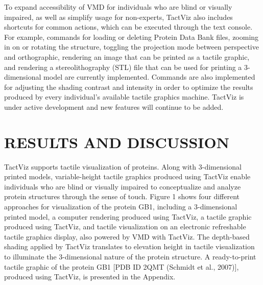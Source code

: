 \documentclass[11.5pt]{sig-alternate} %
\begin{document}
\begin{large}
To expand accessibility of VMD for individuals who are blind or visually impaired, as well as simplify usage for non-experts, TactViz also includes shortcuts for common actions, which can be executed through the text console. For example, commands for loading or deleting Protein Data Bank files, zooming in on or rotating the structure, toggling the projection mode between perspective and orthographic, rendering an image that can be printed as a tactile graphic, and rendering a stereolithography (STL) file that can be used for printing a 3-dimensional model are currently implemented. Commands are also implemented for adjusting the shading contrast and intensity in order to optimize the results produced by every individual’s available tactile graphics machine. TactViz is under active development and new features will continue to be added.

\section*{RESULTS AND DISCUSSION}

TactViz supports tactile visualization of proteins. Along with 3-dimensional printed models, variable-height tactile graphics produced using TactViz enable individuals who are blind or visually impaired to conceptualize and analyze protein structures through the sense of touch. Figure 1 shows four different approaches for visualization of the protein GB1, including a 3-dimensional printed model, a computer rendering produced using TactViz, a tactile graphic produced using TactViz, and tactile visualization on an electronic refreshable tactile graphics display, also powered by VMD with TactViz. The depth-based shading applied by TactViz translates to elevation height in tactile visualization to illuminate the 3-dimensional nature of the protein structure. A ready-to-print tactile graphic of the protein GB1 [PDB ID 2QMT (Schmidt et al., 2007)], produced using TactViz, is presented in the Appendix. 


\end{large}
\end{document}
